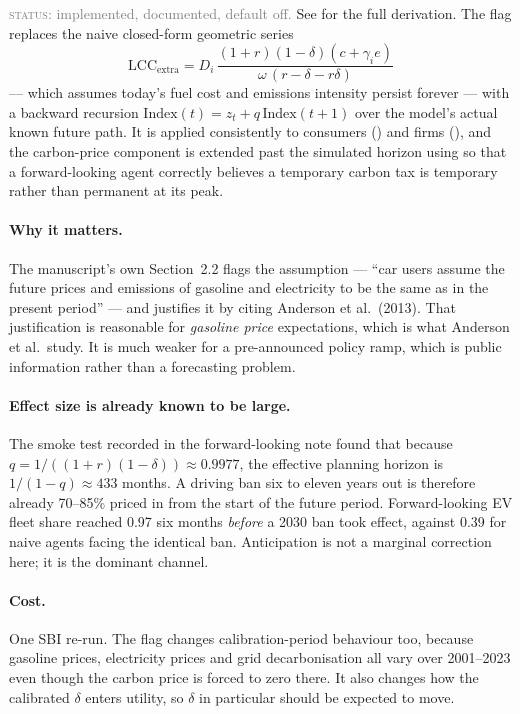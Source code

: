 \documentclass[11pt]{article}
\newcommand{\status}[1]{\textcolor{gray}{\textsc{status:} #1}}
\begin{document}
\status{implemented, documented, default off.}
See  for the
full derivation. The flag  replaces the
naive closed-form geometric series
\begin{equation}
  \mathrm{LCC}_{\mathrm{extra}} = D_i\,
  \frac{(1+r)(1-\delta)(c + \gamma_i e)}{\omega\,(r - \delta - r\delta)}
  \label{eq:naive}
\end{equation}
--- which assumes today's fuel cost and emissions intensity persist forever
--- with a backward recursion $\mathrm{Index}(t) = z_t + q\,\mathrm{Index}(t+1)$
over the model's actual known future path. It is applied consistently to
consumers () and firms
(), and the carbon-price
component is extended past the simulated horizon using
 so that a forward-looking agent
correctly believes a temporary carbon tax is temporary rather than
permanent at its peak.

\paragraph{Why it matters.} The manuscript's own Section~2.2 flags the
assumption --- ``car users assume the future prices and emissions of
gasoline and electricity to be the same as in the present period'' --- and
justifies it by citing Anderson et al.\ (2013). That justification is
reasonable for \emph{gasoline price} expectations, which is what Anderson
et al.\ study. It is much weaker for a pre-announced policy ramp, which is
public information rather than a forecasting problem.

\paragraph{Effect size is already known to be large.} The
 smoke test recorded in the forward-looking note found that
because $q = 1/((1+r)(1-\delta)) \approx 0.9977$, the effective planning
horizon is $1/(1-q) \approx 433$ months. A driving ban six to eleven years
out is therefore already 70--85\% priced in from the start of the future
period. Forward-looking EV fleet share reached 0.97 six months
\emph{before} a 2030 ban took effect, against 0.39 for naive agents facing
the identical ban. Anticipation is not a marginal correction here; it is
the dominant channel.

\paragraph{Cost.} One SBI re-run. The flag changes calibration-period
behaviour too, because gasoline prices, electricity prices and grid
decarbonisation all vary over 2001--2023 even though the carbon price is
forced to zero there. It also changes how the calibrated $\delta$ enters
utility, so $\delta$ in particular should be expected to move.
\end{document}
